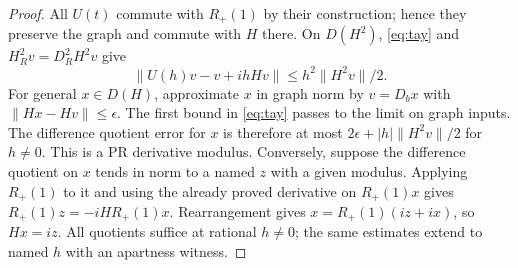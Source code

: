 \begin{proof}
All $U(t)$ commute with $R_+(1)$ by their construction; hence they preserve the graph and commute with $H$ there. On $D(H^2)$, \eqref{eq:tay} and $H_R^2v=D_R^2H^2v$ give
\[
 \|U(h)v-v+ihHv\|\le h^2\|H^2v\|/2 .
\]
For general $x\in D(H)$, approximate $x$ in graph norm by $v=D_bx$ with $\|Hx-Hv\|\le\epsilon$. The first bound in \eqref{eq:tay} passes to the limit on graph inputs. The difference quotient error for $x$ is therefore at most $2\epsilon+|h|\|H^2v\|/2$ for $h\ne0$. This is a PR derivative modulus. Conversely, suppose the difference quotient on $x$ tends in norm to a named $z$ with a given modulus. Applying $R_+(1)$ to it and using the already proved derivative on $R_+(1)x$ gives $R_+(1)z=-iH R_+(1)x$. Rearrangement gives $x=R_+(1)(iz+ix)$, so $Hx=iz$. All quotients suffice at rational $h\ne0$; the same estimates extend to named $h$ with an apartness witness.
\end{proof}

